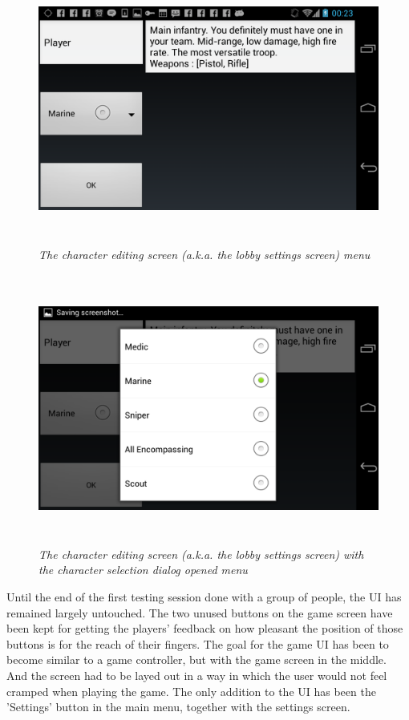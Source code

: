 \documentclass{article}
\begin{document}
\begin{figure}
\includegraphics[height=3.5in,width=6.23in]{./images/android_screenshots/first_development/game_first_development_9.png}
\caption{\small \sl The character editing screen (a.k.a. the lobby settings
screen) menu\label{fig:lobby_settings_1}}
\end{figure}

\begin{figure}
\includegraphics[height=3.5in,width=6.23in]{./images/android_screenshots/first_development/game_first_development_10.png}
\caption{\small \sl The character editing screen (a.k.a. the lobby settings
screen) with the character selection dialog opened
menu\label{fig:lobby_settings_2}}
\end{figure}

Until the end of the first testing session done with a group of people, the UI
has remained largely untouched. The two unused buttons on the game screen have
been kept for getting the players' feedback on how pleasant the position of
those buttons is for the reach of their fingers. The goal for the game UI has
been to become similar to a game controller, but with the game screen in the
middle. And the screen had to be layed out in a way in which the user would not
feel cramped when playing the game. The only addition to the UI has been
the 'Settings' button in the main menu, together with the settings
screen.\newline
\end{document}
